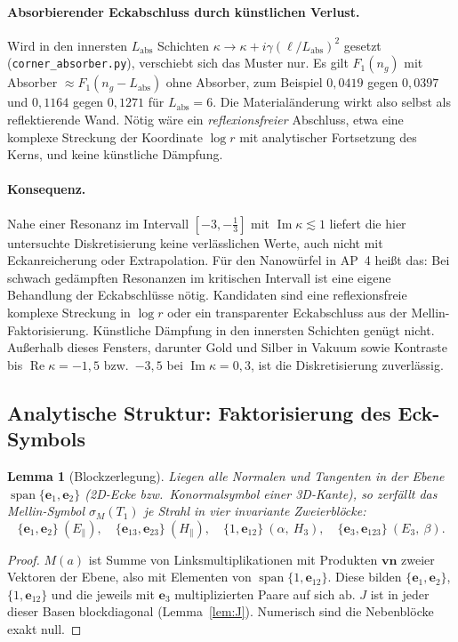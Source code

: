 \documentclass[11pt, a4paper]{article}
\newcommand{\mvec}[1]{\boldsymbol{#1}}
\newcommand{\n}{\mvec{n}}
\theoremstyle{plain}
\newtheorem{lemma}[satz]{Lemma}
\theoremstyle{definition}
\newcommand{\status}[1]{\hfill{\small\sffamily[#1]}}
\begin{document}
\paragraph{Absorbierender Eckabschluss durch künstlichen Verlust.} Wird in den
innersten $L_{\mathrm{abs}}$ Schichten $\kappa\to\kappa+i\gamma(\ell/L_{\mathrm{abs}})^2$
gesetzt (\texttt{corner\_absorber.py}), verschiebt sich das Muster nur. Es gilt
$F_1(n_g)$ mit Absorber $\approx F_1(n_g-L_{\mathrm{abs}})$ ohne Absorber, zum
Beispiel $0{,}0419$ gegen $0{,}0397$ und $0{,}1164$ gegen $0{,}1271$ für
$L_{\mathrm{abs}}=6$. Die Materialänderung wirkt also selbst als reflektierende
Wand. Nötig wäre ein \emph{reflexionsfreier} Abschluss, etwa eine komplexe
Streckung der Koordinate $\log r$ mit analytischer Fortsetzung des Kerns, und keine
künstliche Dämpfung.

\paragraph{Konsequenz.} Nahe einer Resonanz im Intervall $[-3,-\tfrac13]$ mit
$\operatorname{Im}\kappa\lesssim1$ liefert die hier untersuchte Diskretisierung keine
verlässlichen Werte, auch nicht mit Eckanreicherung oder Extrapolation. Für den
Nanowürfel in AP~4 heißt das: Bei schwach gedämpften Resonanzen im kritischen
Intervall ist eine eigene Behandlung der Eckabschlüsse nötig. Kandidaten sind
eine reflexionsfreie komplexe Streckung in $\log r$ oder ein transparenter
Eckabschluss aus der Mellin-Faktorisierung. Künstliche Dämpfung in den innersten
Schichten genügt nicht. Außerhalb dieses Fensters, darunter
Gold und Silber in Vakuum sowie Kontraste bis $\operatorname{Re}\kappa=-1{,}5$ bzw.\ $-3{,}5$
bei $\operatorname{Im}\kappa=0{,}3$, ist die Diskretisierung zuverlässig.

\subsection{Analytische Struktur: Faktorisierung des Eck-Symbols}\label{sec:faktor}

\begin{lemma}[Blockzerlegung]\label{lem:block}\status{bewiesen}
Liegen alle Normalen und Tangenten in der Ebene $\operatorname{span}\{\mvec{e}_1,\mvec{e}_2\}$
(2D-Ecke bzw.\ Konormalsymbol einer 3D-Kante), so zerfällt das Mellin-Symbol
$\sigma_M(T_1)$ je Strahl in vier invariante Zweierblöcke:
\[
  \{\mvec{e}_1,\mvec{e}_2\}\ (E_\parallel),\quad \{\mvec{e}_{13},\mvec{e}_{23}\}\ (H_\parallel),\quad
  \{1,\mvec{e}_{12}\}\ (\alpha,\ H_3),\quad \{\mvec{e}_3,\mvec{e}_{123}\}\ (E_3,\ \beta).
\]
\end{lemma}
\begin{proof}
$M(a)$ ist Summe von Linksmultiplikationen mit Produkten $\mvec{v}\n$ zweier
Vektoren der Ebene, also mit Elementen von $\operatorname{span}\{1,\mvec{e}_{12}\}$.
Diese bilden $\{\mvec{e}_1,\mvec{e}_2\}$, $\{1,\mvec{e}_{12}\}$ und die jeweils mit
$\mvec{e}_3$ multiplizierten Paare auf sich ab. $J$ ist in jeder dieser Basen
blockdiagonal (Lemma~\ref{lem:J}). Numerisch sind die Nebenblöcke exakt null.
\end{proof}
\end{document}
